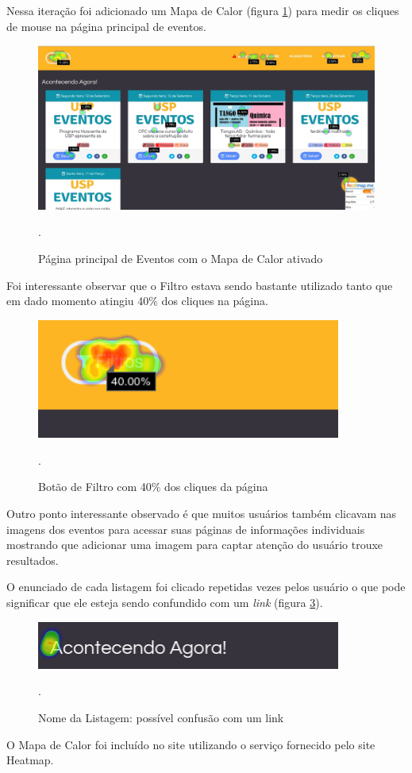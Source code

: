 \par Nessa iteração foi adicionado um Mapa de Calor (figura \ref{fig:heatmap}) para medir os cliques de mouse na página principal de eventos.
\begin{figure}[htb]
\centering
\includegraphics[width=15cm]{figuras/heatmap}
\caption{\label{fig:heatmap} Página principal de Eventos com o Mapa de Calor ativado}.
\end{figure}

\par Foi interessante observar que o Filtro estava sendo bastante utilizado tanto que em dado momento atingiu 40\% dos cliques na página.
\begin{figure}[htb]
\centering
\includegraphics[width=10cm]{figuras/heatmap_filter}
\caption{\label{fig:heatmap_filter} Botão de Filtro com 40\% dos cliques da página}.
\end{figure}

\par Outro ponto interessante observado é que muitos usuários também clicavam nas imagens dos eventos para acessar suas páginas de informações individuais mostrando que adicionar uma imagem para captar atenção do usuário trouxe resultados.

\par O enunciado de cada listagem foi clicado repetidas vezes pelos usuário o que pode significar que ele esteja sendo confundido com um \emph{link} (figura \ref{fig:heatmap_missclick}).
\begin{figure}[htb]
\centering
\includegraphics[width=10cm]{figuras/heatmap_missclick}
\caption{\label{fig:heatmap_missclick} Nome da Listagem: possível confusão com um link}.
\end{figure}
\par O Mapa de Calor foi incluído no site utilizando o serviço fornecido pelo site Heatmap.

